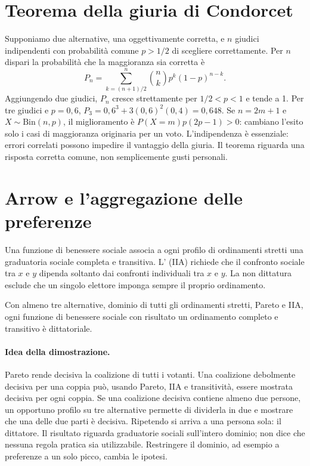 \section{Teorema della giuria di Condorcet}
Supponiamo due alternative, una oggettivamente corretta, e $n$ giudici indipendenti con probabilità comune $p>1/2$ di scegliere correttamente. Per $n$ dispari la probabilità che la maggioranza sia corretta è
\[ P_n=\sum_{k=(n+1)/2}^{n}\binom nk p^k(1-p)^{n-k}. \]
Aggiungendo due giudici, $P_n$ cresce strettamente per $1/2<p<1$ e tende a 1. Per tre giudici e $p=0{,}6$, $P_3=0{,}6^3+3(0{,}6)^2(0{,}4)=0{,}648$. Se $n=2m+1$ e $X\sim\mathrm{Bin}(n,p)$, il miglioramento è $P(X=m)p(2p-1)>0$: cambiano l'esito solo i casi di maggioranza originaria per un voto. L'indipendenza è essenziale: errori correlati possono impedire il vantaggio della giuria. Il teorema riguarda una risposta corretta comune, non semplicemente gusti personali.

\section{Arrow e l'aggregazione delle preferenze}
Una funzione di benessere sociale associa a ogni profilo di ordinamenti stretti una graduatoria sociale completa e transitiva. L' (IIA) richiede che il confronto sociale tra $x$ e $y$ dipenda soltanto dai confronti individuali tra $x$ e $y$. La non dittatura esclude che un singolo elettore imponga sempre il proprio ordinamento.
\begin{teorema}[Arrow]
Con almeno tre alternative, dominio di tutti gli ordinamenti stretti, Pareto e IIA, ogni funzione di benessere sociale con risultato un ordinamento completo e transitivo è dittatoriale.
\end{teorema}
\paragraph{Idea della dimostrazione.} Pareto rende decisiva la coalizione di tutti i votanti. Una coalizione debolmente decisiva per una coppia può, usando Pareto, IIA e transitività, essere mostrata decisiva per ogni coppia. Se una coalizione decisiva contiene almeno due persone, un opportuno profilo su tre alternative permette di dividerla in due e mostrare che una delle due parti è decisiva. Ripetendo si arriva a una persona sola: il dittatore. Il risultato riguarda graduatorie sociali sull'intero dominio; non dice che nessuna regola pratica sia utilizzabile. Restringere il dominio, ad esempio a preferenze a un solo picco, cambia le ipotesi.



